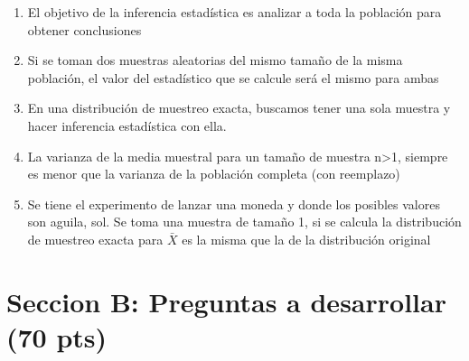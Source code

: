 \documentclass[addpoints]{exam}
\theoremstyle{mytheor}
\begin{document}
\begin{questions}
  \begin{enumerate}
  \item El objetivo de la inferencia estadística es analizar a toda la población para obtener conclusiones
  \item Si se toman dos muestras aleatorias del mismo tamaño de la misma población, el valor del estadístico que se calcule será el mismo para ambas
  \item En una distribución de muestreo exacta, buscamos tener una sola muestra y hacer inferencia estadística con ella. 
  \item La varianza de la media muestral para un tamaño de muestra n>1, siempre es menor que la varianza de la población completa (con reemplazo)
  \item Se tiene el experimento de lanzar una moneda y donde los posibles valores son {aguila, sol}. Se toma una muestra de tamaño 1, si se calcula la distribución de muestreo exacta para $\bar{X}$ es la misma que la de la distribución original
  \end{enumerate}
  
  
\end{questions}
  
  \section*{Seccion B: Preguntas a desarrollar (70 pts)}
  
\end{document}
